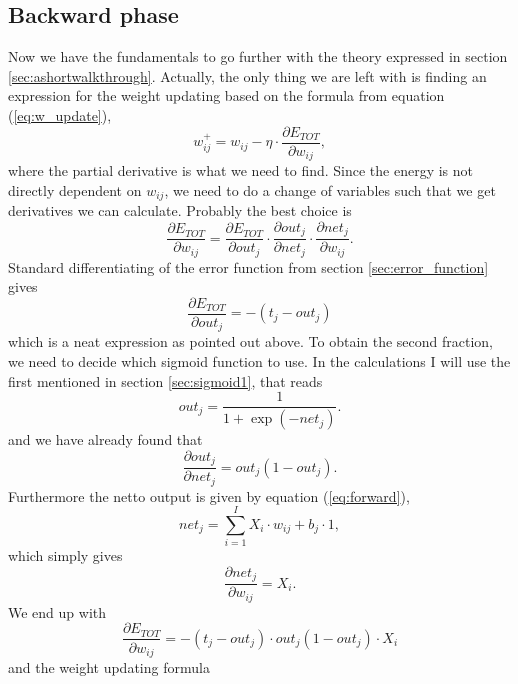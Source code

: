 \subsection{Backward phase}
Now we have the fundamentals to go further with the theory expressed in section \ref{sec:ashortwalkthrough}. Actually, the only thing we are left with is finding an expression for the weight updating based on the formula from equation (\ref{eq:w_update}), 
\begin{equation}
w_{ij}^+= w_{ij} - \eta\cdot\frac{\partial E_{TOT}}{\partial w_{ij}},
\end{equation}
where the partial derivative is what we need to find. Since the energy is not directly dependent on $w_{ij}$, we need to do a change of variables such that we get derivatives we can calculate. Probably the best choice is
\begin{equation}
\frac{\partial E_{TOT}}{\partial w_{ij}}=\frac{\partial E_{TOT}}{\partial out_{j}}\cdot\frac{\partial out_{j}}{\partial net_{j}}\cdot\frac{\partial net_{j}}{\partial w_{ij}}.
\end{equation}
Standard differentiating of the error function from section \ref{sec:error_function} gives
\begin{equation}
\frac{\partial E_{TOT}}{\partial out_{j}}=-(t_j-out_j)
\end{equation}
which is a neat expression as pointed out above. To obtain the second fraction, we need to decide which sigmoid function to use. In the calculations I will use the first mentioned in section \ref{sec:sigmoid1}, that reads
\begin{equation}
out_j=\frac{1}{1+\exp(-net_j)}.
\end{equation}
and we have already found that
\begin{equation}
\frac{\partial out_{j}}{\partial net_{j}}=out_j(1-out_j).
\end{equation}
Furthermore the netto output is given by equation (\ref{eq:forward}),
\begin{equation}
net_j = \sum_{i=1}^{I} X_i\cdot w_{ij} + b_j\cdot 1,
\end{equation}
which simply gives
\begin{equation}
\frac{\partial net_{j}}{\partial w_{ij}}=X_i.
\end{equation}
We end up with 
\begin{equation}
\frac{\partial E_{TOT}}{\partial w_{ij}}=-(t_j-out_j)\cdot out_j(1-out_j)\cdot X_i
\end{equation}
and the weight updating formula

